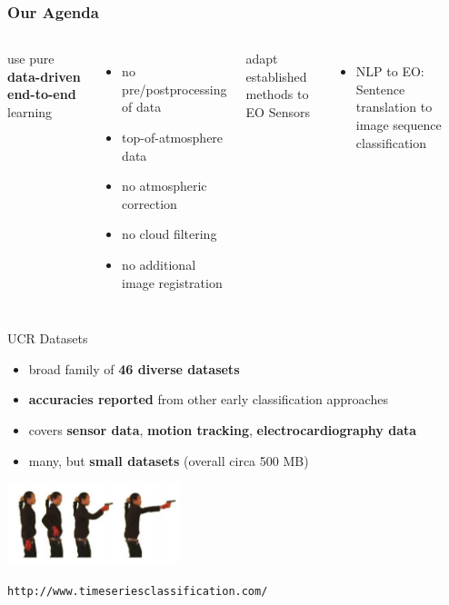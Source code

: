 
\addtocounter{framenumber}{-8}

\begin{frame}
\frametitle{Our Agenda}
\large 

\begin{columns}[t]
	use pure \textbf<1>{data-driven end-to-end} learning
	\begin{itemize}
		\item no pre/postprocessing of data
		\item top-of-atmosphere data
		\item no atmospheric correction
		\item no cloud filtering
		\item no additional image registration
	\end{itemize}
	\vspace{1em}
	adapt established methods to EO Sensors
	\begin{itemize}
		\item NLP to EO: Sentence translation to image sequence classification
	\end{itemize}
	
	\vspace{-2em}
	
	
	
\end{columns}

\end{frame}


\begin{frame}{UCR Datasets}

%		
\begin{itemize}[leftmargin=0cm]
	\item broad family of \textbf{46 diverse datasets}
	\item \textbf{accuracies reported} from other early classification approaches
	\item covers \textbf{sensor data}, \textbf{motion tracking}, \textbf{electrocardiography data}
	\item many, but \textbf{small datasets} \small{(overall circa 500 MB)}
\end{itemize}

\vspace{.5em}
\centering\includegraphics[width=5cm]{images/GunPoint}

\vspace{.5em}

{\small \texttt{http://www.timeseriesclassification.com/}
}
\end{frame}


